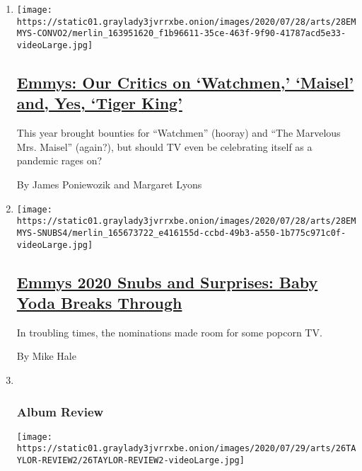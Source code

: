 \begin{enumerate}
\def\labelenumi{\arabic{enumi}.}
\item
  \texttt{[image: https://static01.graylady3jvrrxbe.onion/images/2020/07/28/arts/28EMMYS-CONVO2/merlin\_163951620\_f1b96611-35ce-463f-9f90-41787acd5e33-videoLarge.jpg]}

  \hypertarget{emmys-our-critics-on-watchmen-maisel-and-yes-tiger-king}{%
  \subsection{\texorpdfstring{\href{/2020/07/28/arts/television/emmys-watchmen-handmaids-tale-tiger-king.html}{Emmys:
  Our Critics on `Watchmen,' `Maisel' and, Yes, `Tiger
  King'}}{Emmys: Our Critics on `Watchmen,' `Maisel' and, Yes, `Tiger King'}}\label{emmys-our-critics-on-watchmen-maisel-and-yes-tiger-king}}

  This year brought bounties for ``Watchmen'' (hooray) and ``The
  Marvelous Mrs. Maisel'' (again?), but should TV even be celebrating
  itself as a pandemic rages on?

  By James Poniewozik and Margaret Lyons
\item
  \texttt{[image: https://static01.graylady3jvrrxbe.onion/images/2020/07/28/arts/28EMMYS-SNUBS4/merlin\_165673722\_e416155d-ccbd-49b3-a550-1b775c971c0f-videoLarge.jpg]}

  \hypertarget{emmys-2020-snubs-and-surprises-baby-yoda-breaks-through}{%
  \subsection{\texorpdfstring{\href{/2020/07/28/arts/television/emmys-snubs-mandalorian-zendaya-reese.html}{Emmys
  2020 Snubs and Surprises: Baby Yoda Breaks
  Through}}{Emmys 2020 Snubs and Surprises: Baby Yoda Breaks Through}}\label{emmys-2020-snubs-and-surprises-baby-yoda-breaks-through}}

  In troubling times, the nominations made room for some popcorn TV.

  By Mike Hale
\item ~
  \hypertarget{album-review}{%
  \subsubsection{Album Review}\label{album-review}}

  \texttt{[image: https://static01.graylady3jvrrxbe.onion/images/2020/07/29/arts/26TAYLOR-REVIEW2/26TAYLOR-REVIEW2-videoLarge.jpg]}


\end{enumerate}
